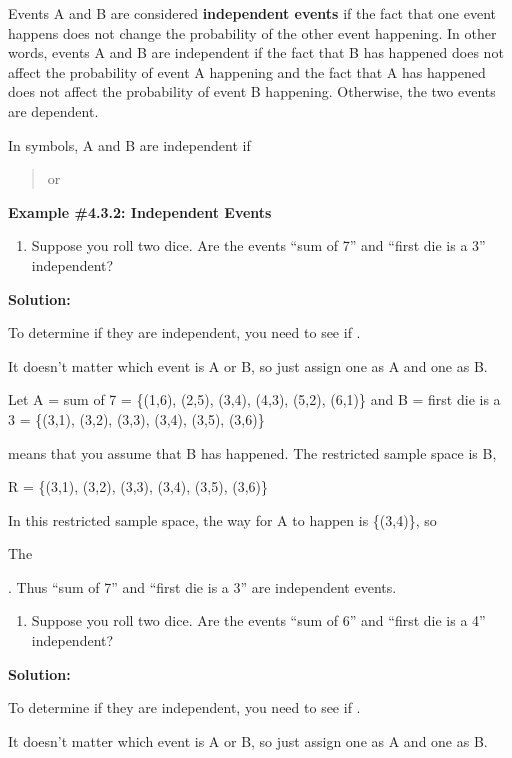 \documentclass[]{book}
\providecommand{\tightlist}{%
  \setlength{\itemsep}{0pt}\setlength{\parskip}{0pt}}
\begin{document}
Events A and B are considered \textbf{independent events} if the fact that
one event happens does not change the probability of the other event
happening. In other words, events A and B are independent if the fact
that B has happened does not affect the probability of event A happening
and the fact that A has happened does not affect the probability of
event B happening. Otherwise, the two events are dependent.

In symbols, A and B are independent if

\begin{quote}
or
\end{quote}

\textbf{Example \#4.3.2: Independent Events}

\begin{enumerate}
\def\labelenumi{\alph{enumi}.}
\tightlist
\item
  Suppose you roll two dice. Are the events ``sum of 7'' and ``first die
  is a 3'' independent?
\end{enumerate}

\textbf{Solution:}

To determine if they are independent, you need to see if .

It doesn't matter which event is A or B, so just assign one as A and
one as B.

Let A = sum of 7 = \{(1,6), (2,5), (3,4), (4,3), (5,2), (6,1)\} and B
= first die is a 3 = \{(3,1), (3,2), (3,3), (3,4), (3,5), (3,6)\}

means that you assume that B has happened. The restricted sample
space is B,

R = \{(3,1), (3,2), (3,3), (3,4), (3,5), (3,6)\}

In this restricted sample space, the way for A to happen is \{(3,4)\},
so

The

. Thus ``sum of 7'' and ``first die is a 3'' are independent events.

\begin{enumerate}
\def\labelenumi{\alph{enumi}.}
\setcounter{enumi}{1}
\tightlist
\item
  Suppose you roll two dice. Are the events ``sum of 6'' and ``first die
  is a 4'' independent?
\end{enumerate}

\textbf{Solution:}

To determine if they are independent, you need to see if .

It doesn't matter which event is A or B, so just assign one as A and
one as B.
\end{document}
